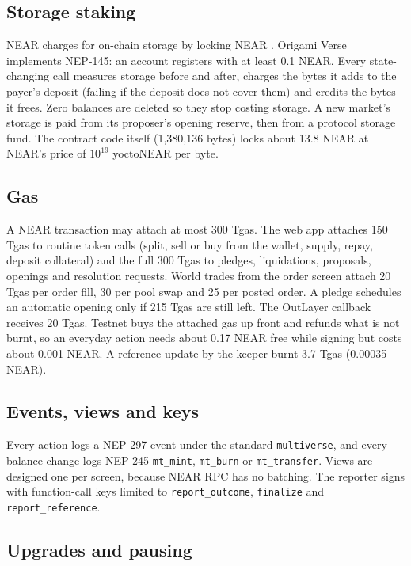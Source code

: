 \documentclass[11pt,a4paper]{article}
\newcommand{\code}[1]{\texttt{\small #1}}
\begin{document}
\subsection{Storage staking}

NEAR charges for on-chain storage by locking NEAR \cite{nep145}. Origami Verse implements NEP-145: an account registers with
at least 0.1 NEAR. Every state-changing call measures storage before and after, charges the bytes it adds to the
payer's deposit (failing if the deposit does not cover them) and credits the bytes it frees. Zero balances are deleted
so they stop costing storage. A new market's storage is paid from its proposer's opening reserve, then from a
protocol storage fund. The contract code itself (1,380,136 bytes) locks about 13.8 NEAR at NEAR's price of
$10^{19}$ yoctoNEAR per byte.

\subsection{Gas}

A NEAR transaction may attach at most 300 Tgas. The web app attaches 150 Tgas to routine token calls (split, sell or
buy from the wallet, supply, repay, deposit collateral) and the full 300 Tgas to pledges, liquidations, proposals,
openings and resolution requests. World trades from the order screen attach 20 Tgas per order fill, 30 per pool swap
and 25 per posted order. A pledge schedules an automatic opening only if 215 Tgas are still left. The OutLayer
callback receives 20 Tgas. Testnet buys the attached gas up front and refunds what is not burnt, so an everyday
action needs about 0.17 NEAR free while signing but costs about 0.001 NEAR. A reference update by the keeper burnt
3.7 Tgas (0.00035 NEAR).

\subsection{Events, views and keys}

Every action logs a NEP-297 event \cite{nep297} under the standard \code{multiverse}, and every balance change logs
NEP-245 \code{mt\_mint}, \code{mt\_burn} or \code{mt\_transfer}. Views are designed one per screen, because NEAR RPC has
no batching. The reporter signs with function-call keys limited to \code{report\_outcome}, \code{finalize} and
\code{report\_reference}.

\subsection{Upgrades and pausing}
\end{document}
